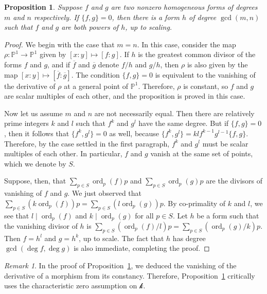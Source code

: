 \documentclass[12pt]{article}
\theoremstyle{plain}
\newtheorem{proposition}[theorem]{Proposition}
\theoremstyle{remark}
\newtheorem{remark}[theorem]{Remark}
\renewcommand{\P}{\mathbb{P}}
\newcommand{\ord}{\operatorname{ord}}
\renewcommand{\k}{\mathscr{k}}
\begin{document}
   \begin{proposition}
       \label{lemma:indeterminacy}
       Suppose $f$ and $g$ are two nonzero homogeneous forms of degrees $m$ and $n$ respectively. If $\{f,g\} = 0$, then there is a form $h$ of degree $\gcd(m, n)$ such that $f$ and $g$ are both powers of $h$, up to scaling.
   \end{proposition}

   \begin{proof}
       \label{proof:indeterminacy}
       We begin with the case that $m = n$. In this case, consider the map $\rho: \P^1 \to \P^{1}$ given by $[x:y] \mapsto [f:g]$. If $h$ is the greatest common divisor of the forms $f$ and $g$, and if $\overline{f}$ and $\overline{g}$ denote $f/h$ and $g/h$, then $\rho$ is also given by the map $[x:y] \mapsto [\overline{f}:\overline{g}]$. The condition $\{f,g\} = 0$ is equivalent to the vanishing of the derivative of $\rho$ at a general point of $\P^{1}$. Therefore, $\rho$ is constant, so $f$ and $g$ are scalar multiples of each other, and the proposition is proved in this case.

       Now let us assume $m$ and $n$ are not necessarily equal.  Then there are relatively prime integers $k$ and $l$ such that $f^{k}$ and $g^{l}$ have the same degree. But if $\{f,g\} = 0$, then it follows that $\{f^{k},g^{l}\} = 0$ as well, because $\{f^{k},g^{l}\} = klf^{k-1}g^{l-1}\{f,g\}$. Therefore, by the case settled in the first paragraph,  $f^{k}$ and $g^{l}$ must be scalar multiples of each other. In particular, $f$ and $g$ vanish at the same set of points, which we denote by $S$.

       Suppose, then, that $\sum_{p \in S} \ord_{p}(f) p$ and $\sum_{p \in S} \ord_{p}(g) p$ are the divisors of vanishing of $f$ and $g$.  We just observed that $\sum_{p \in S} (k \ord_{p}(f)) p = \sum_{p \in S} (l \ord_{p}(g)) p$. By co-primality of $k$ and $l$, we see that $l \mid \ord_{p}(f)$ and $k \mid \ord_{p}(g)$ for all $p \in S$. Let $h$ be a form such that the vanishing divisor of $h$ is $\sum_{p \in S} (\ord_{p}(f)/l) p = \sum_{p \in S} (\ord_{p}(g)/k) p$. Then $f = h^{l}$ and $g = h^{k}$, up to scale.  The fact that $h$ has degree $\gcd(\deg f, \deg g)$ is also immediate, completing the proof.
   \end{proof}

   \begin{remark}
    \label{remark:indeterminacycharacteristic}
    In the proof of Proposition~\ref{lemma:indeterminacy}, we deduced the vanishing of the derivative of a morphism from its constancy. Therefore, Proposition~\ref{lemma:indeterminacy} critically uses the characteristic zero assumption on $\k$.
\end{remark}
\end{document}
